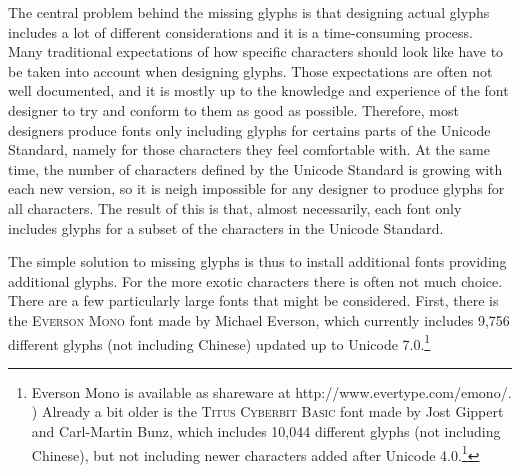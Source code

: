 {{{{{{{{{{{{{{{{{The central problem behind the missing glyphs is that designing actual glyphs includes a lot of different considerations and it is a time-consuming process. Many traditional expectations of how specific characters should look like have to be taken into account when designing glyphs. Those expectations are often not well documented, and it is mostly up to the knowledge and experience of the font designer to try and conform to them as good as possible. Therefore, most designers produce fonts only including glyphs for certains parts of the Unicode Standard, namely for those characters they feel comfortable with. At the same time, the number of characters defined by the Unicode Standard is growing with each new version, so it is neigh impossible for any designer to produce glyphs for all characters. The result of this is that, almost necessarily, each font only includes glyphs for a subset of the characters in the Unicode Standard.

The simple solution to missing glyphs is thus to install additional fonts providing additional glyphs. For the more exotic characters there is often not much choice. There are a few particularly large fonts that might be considered. First, there is the \textsc{Everson Mono} font made by Michael Everson, which currently includes 9,756 different glyphs (not including Chinese) updated up to Unicode 7.0.\footnote{Everson Mono is available as shareware at http://www.evertype.com/emono/. ) Already a bit older is the \textsc{Titus Cyberbit Basic} font made by Jost Gippert and Carl-Martin Bunz, which includes 10,044 different glyphs (not including Chinese), but not including newer characters added after Unicode 4.0.\footnote{Titus Cyberbit Basic is available at http://titus.fkidg1.uni-frankfurt.de/unicode/tituut.asp. )

Further, we suggest to always install at least one so-called \textsc{fall-back font,} which provides glyphs that at least show the user some information about the underlyingly encoded character. Apple Macintoshes have such a font (which is invisible to the user), which is designed by Michael Everson and made available for other systems through the Unicode Consortium.\footnote{The Apple/Everson fallback font is available at http://www.unicode.org/policies/lastresortfont\_eula.html. ) Further, the \textsc{GNU Unifont} is a clever way to produce bitmaps approximating the intended glyph of each available character, updated to Unicode 7.0.\footnote{The GNU Unifont is available at http://unifoundry.com/unifont.html. ) Finally, the Summer Institute of Linguistics provides a \textsc{SIL Unicode BMP Fallback Font}, currently available up to Unicode version 6.1. This font does not even attempt to show a real glyph, but only shows the hexadecimal code inside a box for each character, so a user can at least see the Unicode codepoint of the character to be displayed.\footnote{The SIL Unicode BMP Fallback Font is available at http://scripts.sil.org/UnicodeBMPFallbackFont. )

}}}}}}}}}}}}}}}}}}}}}}
